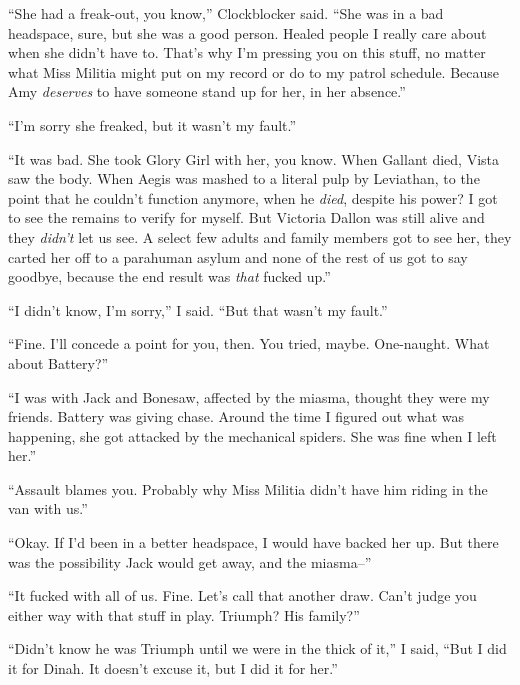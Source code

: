 ``She had a freak-out, you know,'' Clockblocker said.  ``She was in a bad headspace, sure, but she was a good person.  Healed people I really care about when she didn't have to.  That's why I'm pressing you on this stuff, no matter what Miss Militia might put on my record or do to my patrol schedule.  Because Amy \emph{deserves} to have someone stand up for her, in her absence.''



``I'm sorry she freaked, but it wasn't my fault.''



``It was bad.  She took Glory Girl with her, you know.  When Gallant died, Vista saw the body.  When Aegis was mashed to a literal pulp by Leviathan, to the point that he couldn't function anymore, when he \emph{died}, despite his power?  I got to see the remains to verify for myself.  But Victoria Dallon was still alive and they \emph{didn't} let us see.  A select few adults and family members got to see her, they carted her off to a parahuman asylum and none of the rest of us got to say goodbye, because the end result was \emph{that} fucked up.''



``I didn't know, I'm sorry,'' I said.  ``But that wasn't my fault.''



``Fine.  I'll concede a point for you, then.  You tried, maybe.  One-naught.  What about Battery?''



``I was with Jack and Bonesaw, affected by the miasma, thought they were my friends.  Battery was giving chase.  Around the time I figured out what was happening, she got attacked by the mechanical spiders.  She was fine when I left her.''



``Assault blames you.  Probably why Miss Militia didn't have him riding in the van with us.''



``Okay.  If I'd been in a better headspace, I would have backed her up.  But there was the possibility Jack would get away, and the miasma--''



``It fucked with all of us.  Fine.  Let's call that another draw.  Can't judge you either way with that stuff in play.  Triumph?  His family?''



``Didn't know he was Triumph until we were in the thick of it,'' I said,  ``But I did it for Dinah.  It doesn't excuse it, but I did it for her.''



